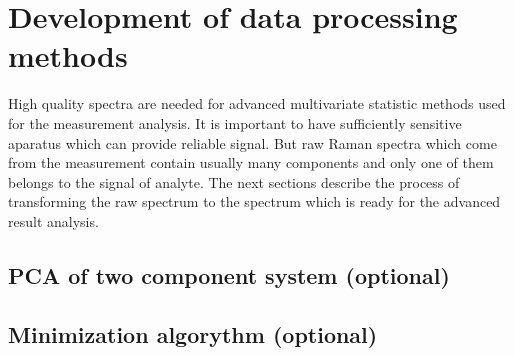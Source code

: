 \section{Development of data processing methods}

High quality spectra are needed for advanced multivariate statistic methods
used for the measurement analysis.
It is important to have sufficiently sensitive aparatus which can provide
reliable signal.
But raw Raman spectra which come from the measurement contain usually many
components and only one of them belongs to the signal of analyte.
The next sections describe the process of transforming the raw spectrum
to the spectrum which is ready for the advanced result analysis.






\subsection{PCA of two component system (optional)}
\subsection{Minimization algorythm (optional)}




